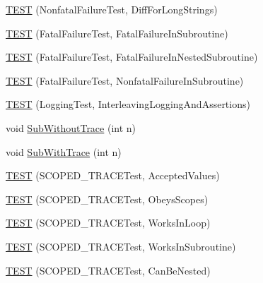 \begin{DoxyCompactItemize}
\mbox{\hyperlink{googletest-master_2googletest_2test_2googletest-output-test___8cc_aaa6c1704a62b7412fd5e053614f47650}{T\+E\+ST}} (Nonfatal\+Failure\+Test, Diff\+For\+Long\+Strings)
\item 
\mbox{\hyperlink{googletest-master_2googletest_2test_2googletest-output-test___8cc_a6076f79ee5f9e8982bba181cbbebb0ed}{T\+E\+ST}} (Fatal\+Failure\+Test, Fatal\+Failure\+In\+Subroutine)
\item 
\mbox{\hyperlink{googletest-master_2googletest_2test_2googletest-output-test___8cc_a8763e3844bd21de9bd7126658a4279c5}{T\+E\+ST}} (Fatal\+Failure\+Test, Fatal\+Failure\+In\+Nested\+Subroutine)
\item 
\mbox{\hyperlink{googletest-master_2googletest_2test_2googletest-output-test___8cc_afe609aef34a68a2ab9809eb48112c5cc}{T\+E\+ST}} (Fatal\+Failure\+Test, Nonfatal\+Failure\+In\+Subroutine)
\item 
\mbox{\hyperlink{googletest-master_2googletest_2test_2googletest-output-test___8cc_ad9bbf46060935b29c42d3116ddbc3566}{T\+E\+ST}} (Logging\+Test, Interleaving\+Logging\+And\+Assertions)
\item 
void \mbox{\hyperlink{googletest-master_2googletest_2test_2googletest-output-test___8cc_a7e222b468bbde7215ce826f10993e746}{Sub\+Without\+Trace}} (int n)
\item 
void \mbox{\hyperlink{googletest-master_2googletest_2test_2googletest-output-test___8cc_a543ee38e0824e47113bb12c3277e09ae}{Sub\+With\+Trace}} (int n)
\item 
\mbox{\hyperlink{googletest-master_2googletest_2test_2googletest-output-test___8cc_a81f7d012241339866fccb3c3750b553b}{T\+E\+ST}} (S\+C\+O\+P\+E\+D\+\_\+\+T\+R\+A\+C\+E\+Test, Accepted\+Values)
\item 
\mbox{\hyperlink{googletest-master_2googletest_2test_2googletest-output-test___8cc_a82f82f6a7caa426cccf8d20113f897c0}{T\+E\+ST}} (S\+C\+O\+P\+E\+D\+\_\+\+T\+R\+A\+C\+E\+Test, Obeys\+Scopes)
\item 
\mbox{\hyperlink{googletest-master_2googletest_2test_2googletest-output-test___8cc_a46dcedbe67765adaebc7740ee17a88de}{T\+E\+ST}} (S\+C\+O\+P\+E\+D\+\_\+\+T\+R\+A\+C\+E\+Test, Works\+In\+Loop)
\item 
\mbox{\hyperlink{googletest-master_2googletest_2test_2googletest-output-test___8cc_a492695898501cea9f99ccd690c2b3991}{T\+E\+ST}} (S\+C\+O\+P\+E\+D\+\_\+\+T\+R\+A\+C\+E\+Test, Works\+In\+Subroutine)
\item 
\mbox{\hyperlink{googletest-master_2googletest_2test_2googletest-output-test___8cc_ae402e91f305e54f5f14a172a0fb0831b}{T\+E\+ST}} (S\+C\+O\+P\+E\+D\+\_\+\+T\+R\+A\+C\+E\+Test, Can\+Be\+Nested)

\end{DoxyCompactItemize}
